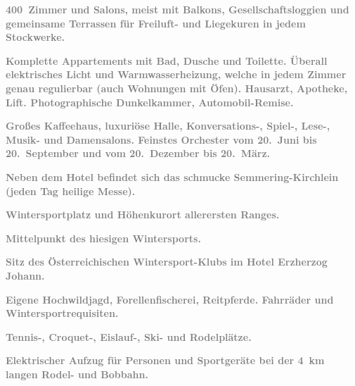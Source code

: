 \pstart
           \centering{}\textcolor{gray}{\textbf{400 Zimmer und Salons, meist mit Balkons, Gesellschaftsloggien
                  und gemeinsame Terrassen für Freiluft- und Liegekuren in jedem Stockwerke.}}\pend
           
\pstart
           \centering{}\textcolor{gray}{\textbf{Komplette Appartements mit Bad, Dusche und Toilette. Überall
                  elektrisches Licht und Warmwasserheizung, welche in jedem Zimmer genau regulierbar
                  (auch Wohnungen mit Öfen). Hausarzt, Apotheke, Lift. Photographische Dunkelkammer,
                  Automobil-Remise.}}\pend
           
\pstart
           \centering{}\textcolor{gray}{\textbf{Großes Kaffeehaus, luxuriöse Halle, Konversations-, Spiel-,
                  Lese-, Musik- und Damensalons. Feinstes Orchester vom 20. Juni bis 20. September
                  und vom 20. Dezember bis 20. März.}}\pend
           
\pstart
           \centering{}\textcolor{gray}{\textbf{Neben dem Hotel befindet sich das schmucke Semmering-Kirchlein (jeden Tag heilige Messe).}}\pend
           
\pstart
           \centering{}\textcolor{gray}{\textbf{Wintersportplatz und Höhenkurort allerersten Ranges.}}\pend
           
\pstart
           \centering{}\textcolor{gray}{\textbf{Mittelpunkt des hiesigen Wintersports.}}\pend
           
\pstart
           \centering{}\textcolor{gray}{\textbf{Sitz des Österreichischen
                     Wintersport-Klubs im Hotel Erzherzog
                     Johann.}}\pend
           
\pstart
           \centering{}\textcolor{gray}{\textbf{Eigene Hochwildjagd, Forellenfischerei, Reitpferde. Fahrräder
                  und Wintersportrequisiten.}}\pend
           
\pstart
           \centering{}\textcolor{gray}{\textbf{Tennis-, Croquet-, Eislauf-, Ski- und Rodelplätze.}}\pend
           
\pstart
           \centering{}\textcolor{gray}{\textbf{Elektrischer Aufzug für Personen und Sportgeräte bei der 4 km
                  langen Rodel- und Bobbahn.}}\pend
           
